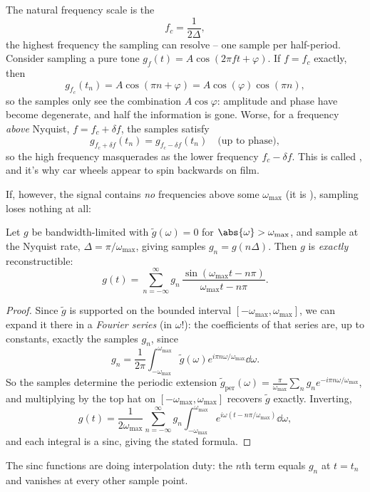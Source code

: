 The natural frequency scale is the 
$$
f_c = \frac{1}{2 \Delta},
$$
the highest frequency the sampling can resolve -- one sample per half-period. Consider sampling a pure tone $g_f(t) = A\cos(2 \pi f t + \varphi)$.
If $f = f_c$ exactly, then
$$
g_{f_c}(t_n) = A \cos (\pi n + \varphi) = A \cos (\varphi) \cos(\pi n),
$$
so the samples only see the combination $A \cos \varphi$: amplitude and phase have become degenerate, and half the information is gone.
Worse, for a frequency \emph{above} Nyquist, $f = f_c + \delta f$, the samples satisfy
$$
g_{f_c + \delta f}(t_n) = g_{f_c - \delta f}(t_n) \quad \text{(up to phase)},
$$
so the high frequency masquerades as the lower frequency $f_c - \delta f$. This is called , and it's why car wheels appear to spin backwards on film.

If, however, the signal contains \emph{no} frequencies above some $\omega_{\max}$ (it is ), sampling loses nothing at all:

\begin{theorem}
    Let $g$ be bandwidth-limited with $\tilde{g}(\omega) = 0$ for $\abs{\omega} > \omega_{\max}$, and sample at the Nyquist rate, $\Delta = \pi / \omega_{\max}$, giving samples $g_n = g(n \Delta)$. Then $g$ is \emph{exactly} reconstructible:
    $$
    g(t) = \sum_{n = -\infty}^{\infty} g_n \, \frac{\sin (\omega_{\max}t - n \pi)}{\omega_{\max} t - n \pi}.
    $$
\end{theorem}
\begin{proof}
    Since $\tilde{g}$ is supported on the bounded interval $[-\omega_{\max}, \omega_{\max}]$, we can expand it there in a \emph{Fourier series} (in $\omega$!):
    the coefficients of that series are, up to constants, exactly the samples $g_n$, since
    $$
    g_n = \frac{1}{2\pi}\int_{-\omega_{\max}}^{\omega_{\max}} \tilde{g}(\omega) e^{i \pi n \omega/\omega_{\max}} \dd \omega.
    $$
    So the samples determine the periodic extension $\tilde{g}_{\text{per}}(\omega) = \frac{\pi}{\omega_{\max}} \sum_n g_n e^{-i \pi n \omega/\omega_{\max}}$, and multiplying by the top hat on $[-\omega_{\max}, \omega_{\max}]$ recovers $\tilde{g}$ exactly. Inverting,
    $$
    g(t) = \frac{1}{2 \omega_{\max}} \sum_{n = -\infty}^{\infty} g_n \int_{-\omega_{\max}}^{\omega_{\max}} e^{i \omega(t - n \pi/\omega_{\max})} \dd \omega,
    $$
    and each integral is a sinc, giving the stated formula.
\end{proof}

The sinc functions are doing interpolation duty: the $n$th term equals $g_n$ at $t = t_n$ and vanishes at every other sample point.

